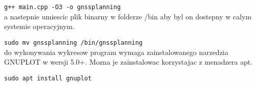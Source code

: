 \documentclass[twocolumn]{article}
\begin{document}
\verb|g++ main.cpp -O3 -o gnssplanning| \\
a nastepnie umiescic plik binarny w folderze /bin aby byl on dostepny w calym systemie operacyjnym.

\verb|sudo mv gnssplanning /bin/gnssplanning| \\
do wykonywania wykresow program wymaga zainstalowanego narzedzia GNUPLOT w wersji 5.0+. Mozna je zainstalowac korzystajac z menadzera apt.

\verb|sudo apt install gnuplot|
\end{document}
